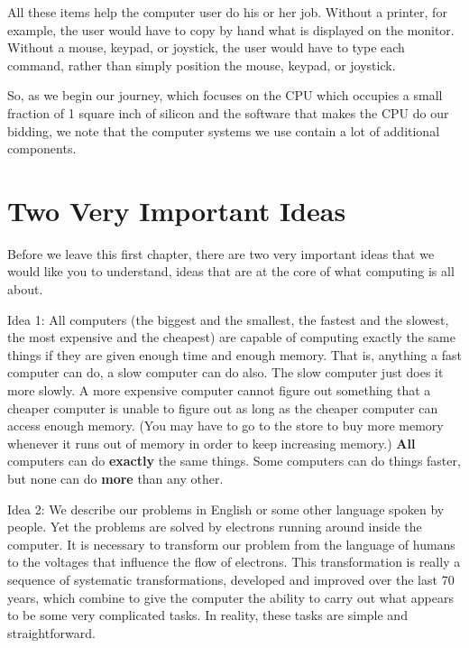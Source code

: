 \documentclass{patt}
\begin{document}
All these items help the computer user do
his or her job.  Without a printer, for example, the user would
have to copy by hand what is displayed on the monitor.  Without a
mouse, keypad, or joystick, the user would have to type each command, 
rather than simply position the mouse, keypad, or joystick.

So, as we begin our journey, which focuses on the CPU which occupies a small
fraction of 1 square inch of silicon and the software that makes the CPU do
our bidding, we note that the computer systems we use contain a lot of 
additional components.

\vspace{-6pt}
\section{Two Very Important Ideas}
\label{sec:two_ideas}

Before we leave this first chapter, there are two
very important ideas that we would like you to understand,
ideas that are at the core of what computing is all about.

\begin{altdescription}
  \item[Idea 1:]  All computers (the biggest and the smallest, the fastest and
  the slowest, the most expensive and the cheapest) are capable of
  computing exactly the same things if they are given enough time and
  enough memory.  That is, anything a fast computer can do, a slow
  computer can do also.  The slow computer just does it more slowly.
  A more expensive computer cannot figure out something that a cheaper
  computer is unable to figure out as long as the cheaper computer can
  access enough memory.  (You may have to go to the store to buy more memory
  whenever it runs out of memory in order to keep increasing memory.)
  {\bfseries All} computers can do {\bfseries exactly} the same things.  Some
  computers can do things faster, but none can do {\bfseries more} than any\break
  other.

\item[Idea 2:] We describe our problems in English or some other language
    spoken by people.  Yet the problems are solved by electrons running
    around inside the computer.  It is necessary to transform our problem
    from the language of humans to the voltages that influence the flow
    of electrons.  This transformation is really a sequence of systematic
    transformations, developed and improved over the last 70 years, which
    combine to give the computer the ability to carry out what appears to
    be some very complicated tasks.  In reality, these tasks are simple
    and straightforward.
\end{altdescription}
\end{document}
